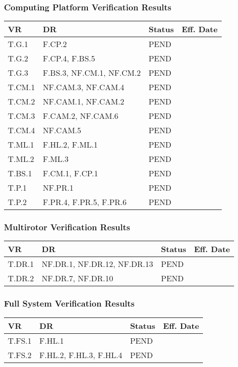 \documentclass[10pt,letterpaper]{article}
\begin{document}
\subsubsection{Computing Platform Verification Results}
\begin{table}[H]
	\centering
	\begin{tabular}{llll}
	\hline
	\textbf{VR} & \textbf{DR} & \textbf{Status} & \textbf{Eff. Date} \\
	\hline
	T.G.1 & F.CP.2 & PEND   & \\
	T.G.2 & F.CP.4, F.BS.5 & PEND   & \\
	T.G.3 & F.BS.3, NF.CM.1, NF.CM.2 & PEND   & \\
	
	T.CM.1 & NF.CAM.3, NF.CAM.4   & PEND   & \\
	T.CM.2 & NF.CAM.1, NF.CAM.2   & PEND   & \\
	T.CM.3 & F.CAM.2, NF.CAM.6   & PEND   & \\
	T.CM.4 & NF.CAM.5   & PEND   & \\
	
	T.ML.1 & F.HL.2, F.ML.1 & PEND   & \\
    T.ML.2 & F.ML.3 & PEND   & \\
    
    T.BS.1 & F.CM.1, F.CP.1 & PEND   & \\
    
    T.P.1 & NF.PR.1 & PEND   & \\
    T.P.2 & F.PR.4, F.PR.5, F.PR.6 & PEND   & \\
	\hline
	\end{tabular}
\end{table}

\subsubsection{Multirotor Verification Results}
\begin{table}[H]
	\centering
	\begin{tabular}{llll}
	\hline
	\textbf{VR} & \textbf{DR} & \textbf{Status} & \textbf{Eff. Date} \\
	\hline
    T.DR.1 & NF.DR.1, NF.DR.12, NF.DR.13  & PEND   & \\
	T.DR.2 & NF.DR.7, NF.DR.10 & PEND   & \\
	\hline
	\end{tabular}
\end{table}

\subsubsection{Full System Verification Results}
\begin{table}[H]
	\centering
	\begin{tabular}{llll}
	\hline
	\textbf{VR} & \textbf{DR} & \textbf{Status} & \textbf{Eff. Date} \\
	\hline
    T.FS.1 & F.HL.1  & PEND   & \\
	T.FS.2 & F.HL.2, F.HL.3, F.HL.4 & PEND   & \\
	\hline
	\end{tabular}
\end{table}
\end{document}

